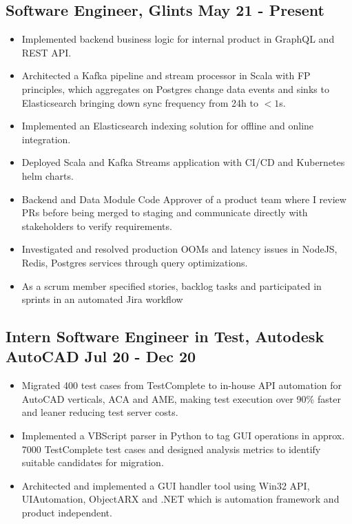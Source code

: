 \documentclass[9pts]{article}
\begin{document}
\subsection*{Software Engineer, Glints \hfill May 21 - Present}
\begin{itemize}
    \item Implemented backend business logic for internal product in GraphQL and REST API.
    \item Architected a Kafka pipeline and stream processor in Scala with FP principles, which aggregates on Postgres change data events and sinks to Elasticsearch bringing down sync frequency from 24h to $<1$s.
    \item Implemented an Elasticsearch indexing solution for offline and online integration.
    \item Deployed Scala and Kafka Streams application with CI/CD and Kubernetes helm charts.
    \item Backend and Data Module Code Approver of a product team where I review PRs before being merged to staging and communicate directly with stakeholders to verify requirements.
    \item Investigated and resolved production OOMs and latency issues in NodeJS, Redis, Postgres services through query optimizations.
    \item As a scrum member specified stories, backlog tasks and participated in sprints in an automated Jira workflow
\end{itemize}

\subsection*{Intern Software Engineer in Test, Autodesk AutoCAD \hfill Jul 20 - Dec 20}
\begin{itemize}
    \item Migrated 400 test cases from TestComplete to in-house API automation for AutoCAD verticals, ACA and AME, making test execution over 90\% faster and leaner reducing test server costs.
    \item Implemented a VBScript parser in Python to tag GUI operations in approx. 7000 TestComplete test cases and designed analysis metrics to identify suitable candidates for migration.
    \item Architected and implemented a GUI handler tool using Win32 API, UIAutomation, ObjectARX and .NET which is automation framework and product independent.
\end{itemize}
\end{document}
